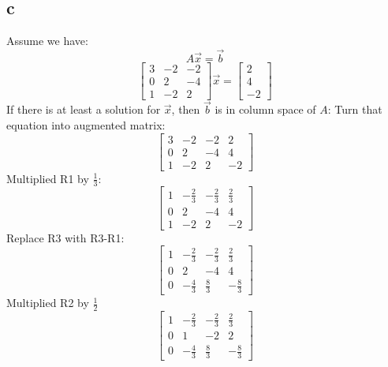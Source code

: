 \documentclass[10pt]{article}
\begin{document}
\subsection*{c}
\noindent Assume we have:
\begin{equation*}
    A\Vec{x} = \Vec{b}
\end{equation*}
\begin{equation*}
    \begin{bmatrix}
        3 & -2 & -2 \\
        0 & 2 & -4 \\
        1 & -2 & 2
    \end{bmatrix}
    \Vec{x}=
    \begin{bmatrix}
        2 \\
        4 \\
        -2
    \end{bmatrix}
\end{equation*}
\noindent If there is at least a solution for $\Vec{x}$, then $\Vec{b}$ is in column space of $A$:
\noindent Turn that equation into augmented matrix:
\begin{equation*}
    \begin{bmatrix}
        3 & -2 & -2 & 2 \\
        0 & 2 & -4 & 4 \\
        1 & -2 & 2 & -2
    \end{bmatrix}
\end{equation*}
\noindent Multiplied R1 by $\frac{1}{3}$:
\begin{equation*}
    \begin{bmatrix}
        1 & -\frac{2}{3} & -\frac{2}{3} & \frac{2}{3} \\
        0 & 2 & -4 & 4 \\
        1 & -2 & 2 & -2
    \end{bmatrix}
\end{equation*}
\noindent Replace R3 with R3-R1:
\begin{equation*}
    \begin{bmatrix}
        1 & -\frac{2}{3} & -\frac{2}{3} & \frac{2}{3} \\
        0 & 2 & -4 & 4 \\
        0 & -\frac{4}{3} & \frac{8}{3} & -\frac{8}{3}
    \end{bmatrix}
\end{equation*}
\noindent Multiplied R2 by $\frac{1}{2}$
\begin{equation*}
    \begin{bmatrix}
        1 & -\frac{2}{3} & -\frac{2}{3} & \frac{2}{3} \\
        0 & 1 & -2 & 2 \\
        0 & -\frac{4}{3} & \frac{8}{3} & -\frac{8}{3}
    \end{bmatrix}
\end{equation*}
\end{document}
